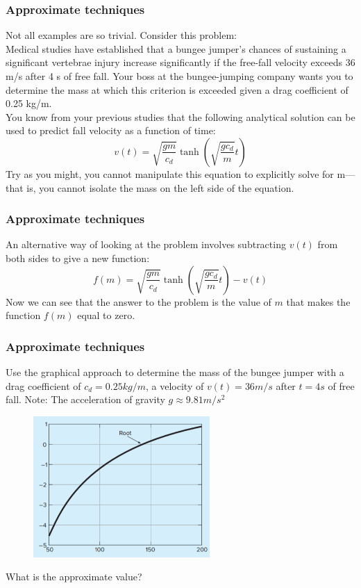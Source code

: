 \documentclass{if-beamer}
\begin{document}
\begin{frame}
\frametitle{Approximate techniques}
Not all examples are so trivial. Consider this problem:\\
\vspace{10pt}
Medical studies have established that a bungee jumper’s chances of sustaining a significant vertebrae injury increase significantly if the free-fall velocity exceeds 36 m/s after 4 s of free fall. Your boss at the bungee-jumping company wants you to determine the mass at which this criterion is exceeded given a drag coefficient of 0.25 kg/m. \\
\vspace{10pt}
You know from your previous studies that the following analytical solution can be used to predict fall velocity as a function of time:
$$v(t)= \sqrt{\frac{gm}{c_d}}\tanh\left(\sqrt{\frac{gc_d}{m}}t\right)  $$
Try as you might, you cannot manipulate this equation to explicitly solve for m—that is, you cannot isolate the mass on the left side of the equation.
\end{frame}

\begin{frame}
\frametitle{Approximate techniques}
An alternative way of looking at the problem involves subtracting $v(t)$ from both sides to give a new function:
$$f(m) = \sqrt{\frac{gm}{c_d}}\tanh\left(\sqrt{\frac{gc_d}{m}}t\right) -v(t) $$
Now we can see that the answer to the problem is the value of $m$ that makes the function $f(m)$ equal to zero.
\end{frame}

\begin{frame}
\frametitle{Approximate techniques}
Use the graphical approach to determine the mass of the bungee jumper with a drag coefficient of $c_d = 0.25 kg/m$, a velocity of $v(t)=36 m/s$ after $t = 4 s$ of free fall. Note: The acceleration of gravity $g \approx 9.81 m/s^2$
\begin{figure}
	\centering
	\includegraphics[width = 0.6\textwidth]{figures/BunjeeJumpGraph}
\end{figure}
 What is the approximate value? 
\end{frame}
\end{document}

